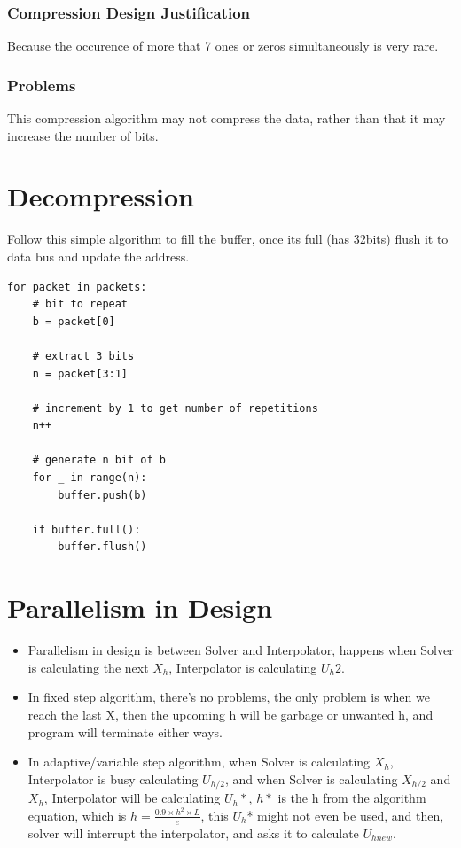 \documentclass[12pt]{report}
\begin{document}
\subsubsection{Compression Design Justification}
Because the occurence of more that 7 ones or zeros simultaneously is very rare.

\subsubsection{Problems}
This compression algorithm may not compress the data, rather than that it may increase the number of bits.

\section{Decompression}
Follow this simple algorithm to fill the buffer, once its full (has 32bits) flush it to data bus and update the address.

\begin{verbatim}
for packet in packets:
    # bit to repeat
    b = packet[0]

    # extract 3 bits
    n = packet[3:1]

    # increment by 1 to get number of repetitions
    n++

    # generate n bit of b
    for _ in range(n):
        buffer.push(b)

    if buffer.full():
        buffer.flush()
\end{verbatim}
        
\section{Parallelism in Design} 
\label{sec:parallel}  
\begin{itemize}
    \item Parallelism in design is between Solver and Interpolator, happens when Solver is calculating the next $X_h$, Interpolator is calculating $U_h2$.
    \item In fixed step algorithm, there's no problems, the only problem is when we reach the last X, then the upcoming h will be garbage or unwanted h, and program will terminate either ways.
    \item In adaptive/variable step algorithm, when Solver is calculating $X_h$, Interpolator is busy calculating $U_{h/2}$, and when Solver is calculating $X_{h/2}$ and $X_{h}$, Interpolator will be calculating $U_{h}*$, $h*$ is the h from the algorithm equation, which is $h = \frac{0.9 \times h^2 \times L}{e}$, this $U_{h}$* might not even be used, and then, solver will interrupt the interpolator, and asks it to calculate $U_{hnew}$.
\end{itemize}
\end{document}
